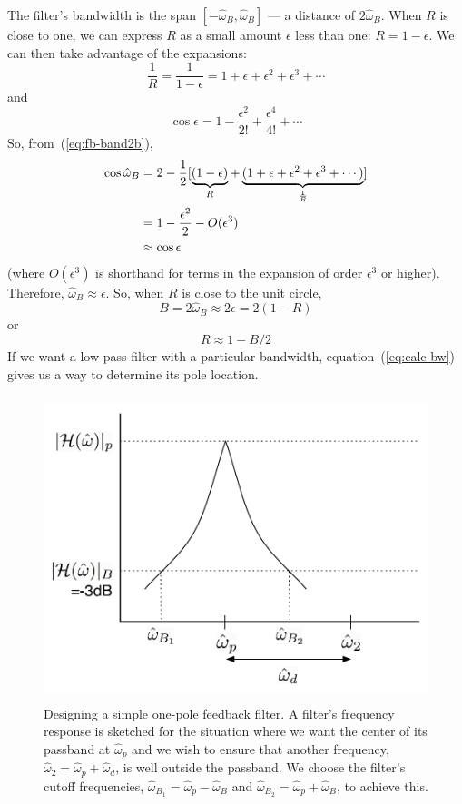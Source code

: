 The filter's bandwidth is the span $[-\hat{\omega}_B, \hat{\omega}_B]$
--- a distance of $2\hat{\omega}_B$.  When $R$ is close to one, we can
express $R$ as a small amount $\epsilon$ less than one:
$R=1-\epsilon$. We can then take advantage of the expansions:
\begin{equation}
\frac{1}{R}=\frac{1}{1-\epsilon}=1+\epsilon+\epsilon^2+\epsilon^3+\cdots
\end{equation}
and
\begin{equation}
\cos\epsilon=1-\frac{\epsilon^2}{2!}+\frac{\epsilon^4}{4!}+\cdots
\end{equation}
So, from~(\ref{eq:fb-band2b}),
\begin{align}
\cos\hat{\omega}_B &= 2-\frac{1}{2}[\underbrace{(1-\epsilon)}_{R} +
            \underbrace{(1+\epsilon+\epsilon^2+\epsilon^3+\cdots)}_{\frac{1}{R}}]
              \notag\\
   &= 1-\frac{\epsilon^2}{2}-O(\epsilon^3) \notag\\
   &\approx \cos\epsilon
\end{align} 
(where $O(\epsilon^3)$ is shorthand for terms in the expansion of
order $\epsilon^3$ or higher).  Therefore,
$\hat{\omega}_B\approx\epsilon$.  So, when $R$ is close to the unit
circle,
\begin{equation}
B = 2\hat{\omega}_B \approx 2\epsilon =2(1-R)
\end{equation}
or 
\begin{equation}
R \approx 1-B/2
\label{eq:calc-bw}
\end{equation}
If we want a low-pass filter with a particular bandwidth,
equation~(\ref{eq:calc-bw}) gives us a way to determine its pole
location.

\begin{figure}
\centerline{\includegraphics[height=3.5in]{ch-iir/design-example}}
\caption[Feedback filter design]{Designing a simple one-pole feedback
  filter. A filter's frequency 
  response is sketched for the situation where we want the center of
  its passband at $\hat{\omega}_p$ and we wish to ensure that another
  frequency, $\hat{\omega}_2 = \hat{\omega}_p + \hat{\omega}_d$, is
  well outside the passband. We choose 
  the filter's cutoff frequencies, $\hat{\omega}_{B_1} =
  \hat{\omega}_p - \hat{\omega}_B$ and $\hat{\omega}_{B_2} =
  \hat{\omega}_p  + \hat{\omega}_B$, to achieve this.
  \label{fig:design-example}}
\end{figure}

